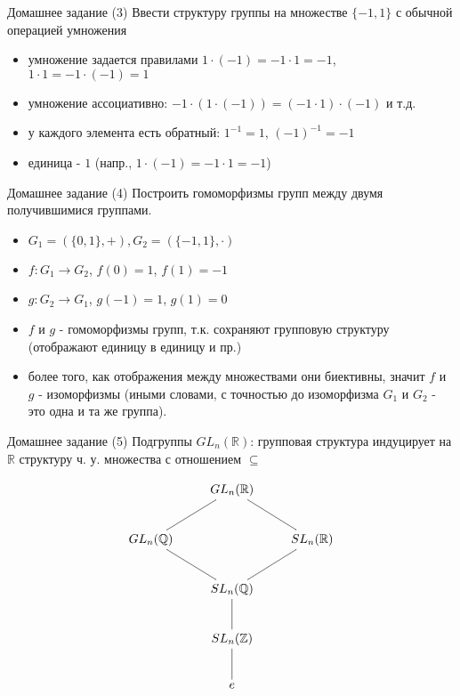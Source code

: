 \documentclass{beamer}
\begin{document}
\begin{frame}{Домашнее задание (3)}
Ввести структуру группы на множестве $\{-1, 1\}$ с обычной операцией умножения\\
  \begin{itemize}
    \item умножение задается правилами $1 \cdot (-1) = -1 \cdot 1 = -1$, $1 \cdot 1 = -1 \cdot (-1) = 1$ 
    \item умножение ассоциативно: $-1 \cdot (1 \cdot (-1)) = (-1 \cdot 1) \cdot (-1)$ и т.д.
    \item у каждого элемента есть обратный: $1^{-1} = 1$, $(-1)^{-1} = -1$
    \item единица - $1$ (напр., $1 \cdot (-1) = -1 \cdot 1 = -1$)
  \end{itemize}  
\end{frame}

\begin{frame}{Домашнее задание (4)}
Построить гомоморфизмы групп между двумя получившимися группами.
  \begin{itemize}
    \item $G_1 = (\{0, 1\}, +), G_2 = (\{-1, 1\}, \cdot)$
    \item $f : G_1 \to G_2$, $f(0) = 1$, $f(1) = -1$
    \item $g : G_2 \to G_1$, $g(-1) = 1$, $g(1) = 0$
    \item $f$ и $g$ - гомоморфизмы групп, т.к. сохраняют групповую структуру (отображают единицу в единицу и пр.)
    \item более того, как отображения между множествами они биективны, значит $f$ и $g$ - изоморфизмы (иными словами, с точностью до изоморфизма $G_1$ и $G_2$ - это одна и та же группа).
  \end{itemize}  
\end{frame}

\begin{frame}{Домашнее задание (5)}
Подгруппы $GL_n(\mathbb{R})$: групповая структура индуцирует на $\mathbb{R}$ структуру ч. у. множества с отношением $\subseteq$
  \begin{center}
\[
\xymatrix{
     & GL_n(\mathbb{R}) \ar@{-}[ld] \ar@{-}[rd] & \\
     GL_n(\mathbb{Q}) \ar@{-}[rd] & & SL_n(\mathbb{R}) \ar@{-}[ld] \\
     & SL_n(\mathbb{Q}) \ar@{-}[d] & \\
     & SL_n(\mathbb{Z}) \ar@{-}[d] & \\
     & e & 
     }
     \]
  \end{center}  
\end{frame}
\end{document}
